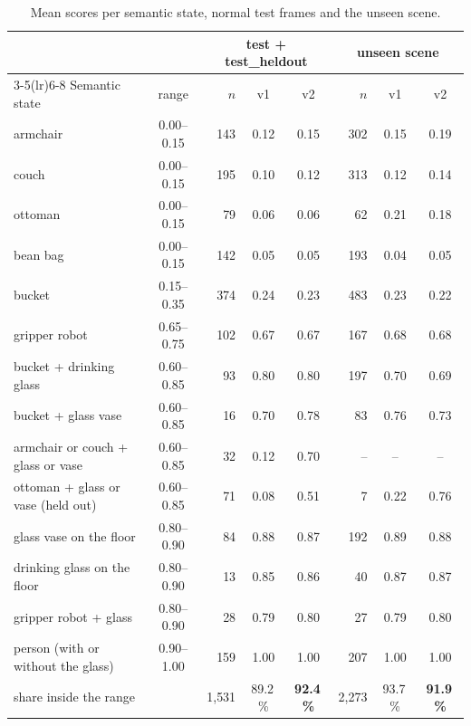 \documentclass[10pt,a4paper]{article}
\begin{document}
\begin{table}[htbp]
\centering\small
\caption{Mean scores per semantic state, normal test frames and the unseen scene.}
\label{tab:policyeval}
\begin{tabular}{lcrccrcc}
\toprule
 & & \multicolumn{3}{c}{test + test\_heldout} & \multicolumn{3}{c}{unseen scene} \\
\cmidrule(lr){3-5}\cmidrule(lr){6-8}
Semantic state & range & $n$ & v1 & v2 & $n$ & v1 & v2 \\
\midrule
armchair & 0.00--0.15 & 143 & 0.12 & 0.15 & 302 & 0.15 & 0.19 \\
couch & 0.00--0.15 & 195 & 0.10 & 0.12 & 313 & 0.12 & 0.14 \\
ottoman & 0.00--0.15 & 79 & 0.06 & 0.06 & 62 & 0.21 & 0.18 \\
bean bag & 0.00--0.15 & 142 & 0.05 & 0.05 & 193 & 0.04 & 0.05 \\
bucket & 0.15--0.35 & 374 & 0.24 & 0.23 & 483 & 0.23 & 0.22 \\
gripper robot & 0.65--0.75 & 102 & 0.67 & 0.67 & 167 & 0.68 & 0.68 \\
bucket + drinking glass & 0.60--0.85 & 93 & 0.80 & 0.80 & 197 & 0.70 & 0.69 \\
bucket + glass vase & 0.60--0.85 & 16 & 0.70 & 0.78 & 83 & 0.76 & 0.73 \\
armchair or couch + glass or vase & 0.60--0.85 & 32 & 0.12 & 0.70 & -- & -- & -- \\
ottoman + glass or vase (held out) & 0.60--0.85 & 71 & 0.08 & 0.51 & 7 & 0.22 & 0.76 \\
glass vase on the floor & 0.80--0.90 & 84 & 0.88 & 0.87 & 192 & 0.89 & 0.88 \\
drinking glass on the floor & 0.80--0.90 & 13 & 0.85 & 0.86 & 40 & 0.87 & 0.87 \\
gripper robot + glass & 0.80--0.90 & 28 & 0.79 & 0.80 & 27 & 0.79 & 0.80 \\
person (with or without the glass) & 0.90--1.00 & 159 & 1.00 & 1.00 & 207 & 1.00 & 1.00 \\
\midrule
\multicolumn{2}{l}{share inside the range} & 1{,}531 & 89.2\,\% & \textbf{92.4\,\%} & 2{,}273 & 93.7\,\% & \textbf{91.9\,\%} \\
\bottomrule
\end{tabular}
\end{table}
\end{document}
